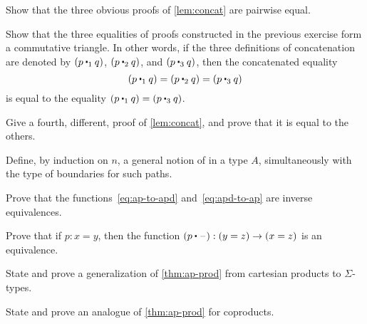 \sectionExercises

\begin{ex}\label{ex:basics:concat}
Show that the three obvious proofs of \cref{lem:concat} are pairwise equal.
\end{ex}

\begin{ex}\label{ex:eq-proofs-commute}
Show that the three equalities of proofs constructed in the previous exercise form a commutative triangle.
In other words, if the three definitions of concatenation are denoted by $(p \mathbin{\ct_1} q)$, $(p\mathbin{\ct_2} q)$, and $(p\mathbin{\ct_3} q)$, then the concatenated equality
\[(p\mathbin{\ct_1} q) = (p\mathbin{\ct_2} q) = (p\mathbin{\ct_3} q)\]
is equal to the equality $(p\mathbin{\ct_1} q) = (p\mathbin{\ct_3} q)$.
\end{ex}

\begin{ex}\label{ex:fourth-concat}
Give a fourth, different, proof of \cref{lem:concat}, and prove that it is equal to the others.
\end{ex}

\begin{ex}\label{ex:npaths}
Define, by induction on $n$, a general notion of  in a type $A$, simultaneously with the type of boundaries for such paths.
\end{ex}

\begin{ex}\label{ex:ap-to-apd-equiv-apd-to-ap}
Prove that the functions~\eqref{eq:ap-to-apd} and~\eqref{eq:apd-to-ap} are inverse equivalences.
\end{ex}

\begin{ex}\label{ex:equiv-concat}
Prove that if $p:x=y$, then the function $(p\ct \blank):(y=z) \to (x=z)$ is an equivalence.
\end{ex}

\begin{ex}\label{ex:ap-sigma}
State and prove a generalization of \cref{thm:ap-prod} from cartesian products to $\Sigma$-types.
\end{ex}

\begin{ex}\label{ex:ap-coprod}
State and prove an analogue of \cref{thm:ap-prod} for coproducts.
\end{ex}

